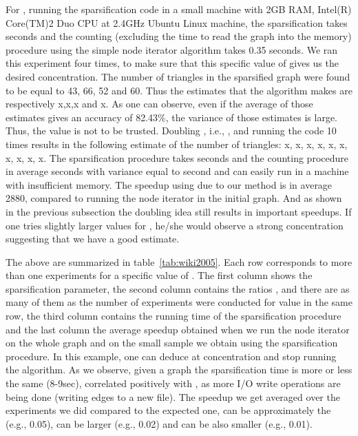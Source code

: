 \documentclass{llncs}
\begin{document}
For , running the sparsification code in a small machine 
with 2GB RAM, Intel(R) Core(TM)2 Duo CPU at 2.4GHz Ubuntu Linux machine, the sparsification
takes seconds and the counting (excluding the time to read the graph into the memory)
procedure using the simple node iterator algorithm takes 0.35 seconds. 
We ran this experiment four times, to make sure that this specific value of  
gives us the desired concentration. 
The number of triangles in the sparsified graph were found to be equal to 43, 66, 52 and 60.
Thus the estimates that the algorithm makes are respectively x,x,x and x.
As one can observe, even if the average of those estimates gives an accuracy of 82.43\%,
the variance of those estimates is large. Thus, the value  is not to be trusted. 
Doubling , i.e., , and running the code 10 times results in the following estimate of the number of triangles:
x, x, x, x, x, x, x, x, x, x.
The sparsification procedure takes  seconds and the counting procedure in average  seconds with variance equal to  second
and can easily run in a machine with insufficient memory.
The speedup using  due to our method is in average 2880, compared to running the node iterator in the initial graph. 
And as shown in the previous subsection the doubling idea still results in important speedups. 
If one tries slightly larger values for , he/she would observe a strong concentration suggesting that we have a good estimate. 

The above are summarized in table~\ref{tab:wiki2005}. Each row corresponds to more than one experiments for a specific value of . 
The first column shows the sparsification parameter, the second column contains the ratios , and there are 
as many of them as the number of experiments were conducted for  value in the same row, the third column
contains the running time of the sparsification procedure and the last column the average speedup obtained when 
we run the node iterator on the whole graph and on the small sample we obtain using the sparsification procedure. 
In this example, one can deduce at  concentration and stop running the algorithm. 
As we observe, given a graph  the sparsification time is more or less the same (8-9sec), correlated positively
with , as more I/O write operations are being done (writing edges to a new file). The speedup we get averaged
over the experiments we did compared to the expected one, can be approximately 
the (e.g., 0.05), can be larger (e.g., 0.02) and can be also smaller (e.g., 0.01).
\end{document}
